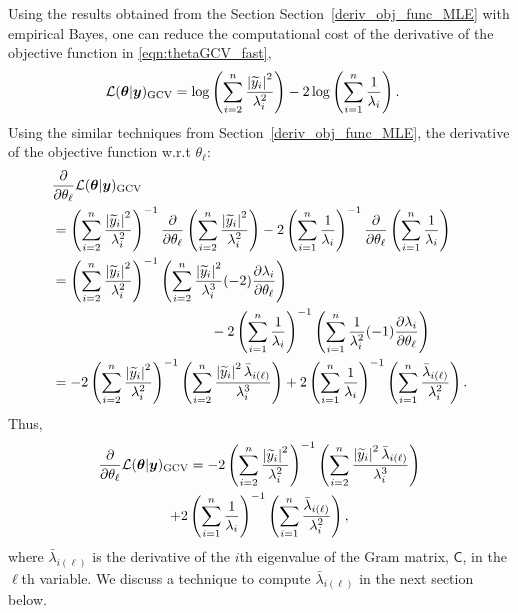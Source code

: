 \documentclass{iitthesis}          %
\newcommand{\bm}[1]{\boldsymbol{#1}}
\newcommand{\vtheta}{{\bm{\theta}}}
\newcommand{\vy}{\bm{y}}
\newcommand{\mC}{\mathsf{C}}
\newcommand{\GCV}{\textup{GCV}}
\def\abs#1{\ensuremath{\left \lvert #1 \right \rvert}}
\newcommand\secref{Section~\ref}
\begin{document}
Using the results obtained from the Section \secref{deriv_obj_func_MLE} with empirical Bayes, one can reduce the computational cost of the derivative of the objective function in \eqref{eqn:thetaGCV_fast},
\begin{align*}
\mathcal{L}(\vtheta | \vy)_\GCV
&= \log \left ( \sum_{i=2}^n \frac{\abs{\widetilde{y}_i}^2}{\lambda_i^2} 
\right) -2\log\left( \sum_{i=1}^n \frac{1}{\lambda_i} \right).
\end{align*}
Using the similar techniques from \secref{deriv_obj_func_MLE}, the derivative of the objective function w.r.t $\theta_\ell$:
\begin{align*}
& \frac{\partial}{\partial \theta_\ell}  \mathcal{L}(\vtheta | \vy)_\GCV
\\
&= \left ( \sum_{i=2}^n \frac{\abs{\widetilde{y}_i}^2}{\lambda_i^2} \right)^{-1}
\frac{\partial}{\partial \theta_\ell} \left ( \sum_{i=2}^n \frac{\abs{\widetilde{y}_i}^2}{\lambda_i^2} \right)
-2 \left( \sum_{i=1}^n \frac{1}{\lambda_i} \right)^{-1}
\frac{\partial}{\partial \theta_\ell} \left( \sum_{i=1}^n \frac{1}{\lambda_i} \right)
\\
&= \left ( \sum_{i=2}^n \frac{\abs{\widetilde{y}_i}^2}{\lambda_i^2} \right)^{-1}
\left ( \sum_{i=2}^n \frac{\abs{\widetilde{y}_i}^2}{\lambda_i^3} (-2) \frac{\partial\lambda_i}{\partial \theta_\ell}  \right)
\\ & \hspace{4cm} 
-2 \left( \sum_{i=1}^n \frac{1}{\lambda_i} \right)^{-1}
\left( \sum_{i=1}^n \frac{1}{\lambda_i^2} (-1)\frac{\partial \lambda_i}{\partial \theta_\ell}  \right)
\\
&= -2 \left ( \sum_{i=2}^n \frac{\abs{\widetilde{y}_i}^2}{\lambda_i^2} \right)^{-1}
\left ( \sum_{i=2}^n \frac{\abs{\widetilde{y}_i}^2 \bar{\lambda}_{i(\ell)} }{\lambda_i^3}    \right)
+ 2 \left( \sum_{i=1}^n \frac{1}{\lambda_i} \right)^{-1}
\left( \sum_{i=1}^n \frac{\bar{\lambda}_{i(\ell)} }{\lambda_i^2}  \right).
\end{align*}
Thus,
\begin{multline}
\frac{\partial}{\partial \theta_\ell}  \mathcal{L}(\vtheta | \vy)_\GCV
\label{eqn:deriv_obj_func_full}
= -2 \left ( \sum_{i=2}^n \frac{\abs{\widetilde{y}_i}^2}{\lambda_i^2} \right)^{-1}
\left ( \sum_{i=2}^n \frac{\abs{\widetilde{y}_i}^2 \bar{\lambda}_{i(\ell)} }{\lambda_i^3}    \right) \\
+ 2 \left( \sum_{i=1}^n \frac{1}{\lambda_i} \right)^{-1}
\left( \sum_{i=1}^n \frac{\bar{\lambda}_{i(\ell)} }{\lambda_i^2}  \right),
\end{multline}
where $\bar{\lambda}_{i(\ell)}$ is the derivative of the $i$th eigenvalue of the Gram matrix, $\mC$, in the $\ell$th variable. We discuss a technique to compute $\bar{\lambda}_{i(\ell)}$ in the next section below.
\end{document}
